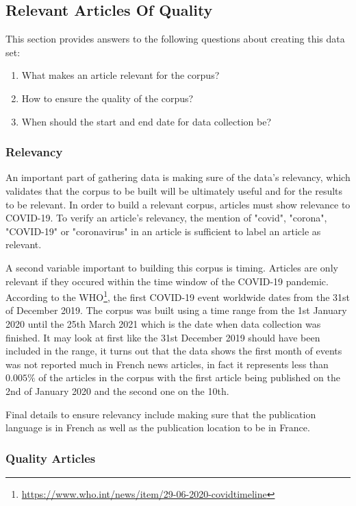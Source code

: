 \subsection{Relevant Articles Of Quality}

This section provides answers to the following questions about creating this data set:
\begin{enumerate}
    \item What makes an article relevant for the corpus?
    \item How to ensure the quality of the corpus?
    \item When should the start and end date for data collection be?
\end{enumerate}

\subsubsection{Relevancy}

An important part of gathering data is making sure of the data's relevancy, which validates that the corpus to be built will be ultimately useful and for the results to be relevant. In order to build a relevant corpus, articles must show relevance to COVID-19. To verify an article's relevancy, the mention of "covid", "corona", "COVID-19" or "coronavirus" in an article is sufficient to label an article as relevant.

A second variable important to building this corpus is timing. Articles are only relevant if they occured within the time window of the COVID-19 pandemic. According to the WHO\footnote{\url{https://www.who.int/news/item/29-06-2020-covidtimeline}}, the first COVID-19 event worldwide dates from the 31st of December 2019. The corpus was built using a time range from the 1st January 2020 until the 25th March 2021 which is the date when data collection was finished. It may look at first like the 31st December 2019 should have been included in the range, it turns out that the data shows the first month of events was not reported much in French news articles, in fact it represents less than $0.005\%$ of the articles in the corpus with the first article being published on the 2nd of January 2020 and the second one on the 10th.

Final details to ensure relevancy include making sure that the publication language is in French as well as the publication location to be in France.

\subsubsection{Quality Articles}

